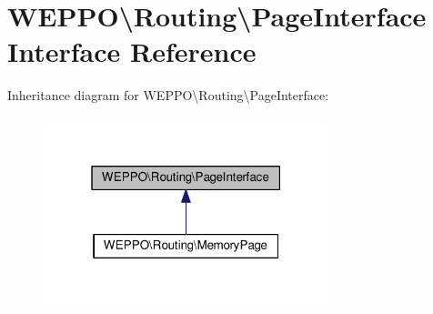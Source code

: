 \hypertarget{interfaceWEPPO_1_1Routing_1_1PageInterface}{}\section{W\+E\+P\+PO\textbackslash{}Routing\textbackslash{}Page\+Interface Interface Reference}
\label{interfaceWEPPO_1_1Routing_1_1PageInterface}


Inheritance diagram for W\+E\+P\+PO\textbackslash{}Routing\textbackslash{}Page\+Interface\+:\nopagebreak
\begin{figure}[H]
\begin{center}
\leavevmode
\includegraphics[width=235pt]{interfaceWEPPO_1_1Routing_1_1PageInterface__inherit__graph}
\end{center}
\end{figure}

